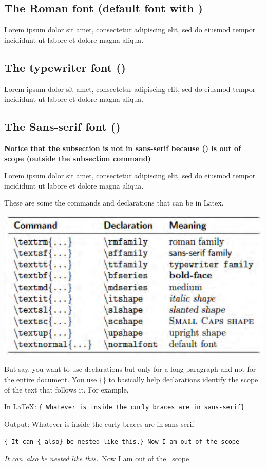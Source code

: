 \documentclass[letterpaper, 12pt]{article}
\begin{document}
  \subsection{The Roman font (default font with \rmfamilyEx)}
  \rmfamily  
  Lorem ipsum dolor sit amet, consectetur adipiscing elit, sed do eiusmod tempor incididunt ut labore et dolore magna aliqua. 

\ttfamily
  \subsection{\ttfamily The typewriter font (\ttfamilyEx)} 

  Lorem ipsum dolor sit amet, consectetur adipiscing elit, sed do eiusmod tempor incididunt ut labore et dolore magna aliqua. 

\sffamily 
  \subsection{The Sans-serif font (\sffamilyEx)} 
  \textbf{Notice that the subsection is not in sans-serif because (\sffamilyEx) is out of scope (outside the subsection command)}


  Lorem ipsum dolor sit amet, consectetur adipiscing elit, sed do eiusmod tempor incididunt ut labore et dolore magna aliqua. 

\rmfamily
\vspace{2.0mm}
These are some the commands and declarations that can be in Latex.


\includegraphics[width=\linewidth]{arguments_and_declarations.png}


But say, you want to use declarations but only for a long paragraph and not for the
entire document.
You use \{\} to basically help declarations identify the scope of the text that
follows it. For example,

\vspace{2.0mm}

In \LaTeX\@: \texttt{\{\sffamilyEx\ Whatever is inside the curly braces are in sans-serif\}}


Output: {\sffamily Whatever is inside the curly braces are in sans-serif}


\vspace{2.0mm}
\texttt{\{\emEx\ It can \{\emEx\ also\} be nested like this.\} Now I am out of the \emEx scope}


{\em It can{\em\ also} be nested like this.}\ Now I am out of the \emEx\ scope
\end{document}
